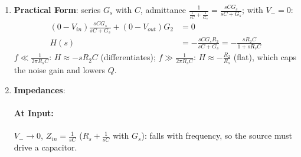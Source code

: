 \begin{enumerate}
\begin{align*}
      F(s) = \frac{G_2}{G_2 + sC} = \frac{1}{1 + s R_2 C}
    \end{align*}
    a pole in the loop: with the op-amp pole, two poles give the ringing above.
  \item \textbf{Practical Form}: series \(G_s\) with \(C\), admittance
    \(\frac{1}{\frac{1}{sC} + \frac{1}{G_s}} = \frac{sC G_s}{sC + G_s}\); with \(V_- = 0\):
    \begin{align*}
      (0 - V_{in}) \frac{sC G_s}{sC + G_s} + (0 - V_{out}) G_2 &= 0 \\
      H(s) &= -\frac{sC G_s R_2}{sC + G_s} = -\frac{s R_2 C}{1 + s R_s C}
    \end{align*}
    \(f \ll \frac{1}{2\pi R_s C}\): \(H \approx -s R_2 C\) (differentiates);
    \(f \gg \frac{1}{2\pi R_s C}\): \(H \approx -\frac{R_2}{R_s}\) (flat), which caps the noise gain and
    lowers \(Q\).
  \item \textbf{Impedances}:
    \paragraph{At Input:} \(V_- \to 0\), \(Z_{in} = \frac{1}{sC}\) (\(R_s + \frac{1}{sC}\) with \(G_s\)): falls
    with frequency, so the source must drive a capacitor.

\end{enumerate}
